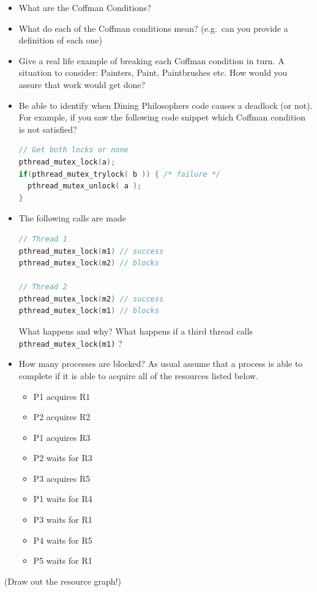 \begin{itemize}
\item
  What are the Coffman Conditions?
\item
  What do each of the Coffman conditions mean? (e.g.~can you provide a definition of each one)
\item
  Give a real life example of breaking each Coffman condition in turn. A situation to consider: Painters, Paint, Paintbrushes etc. How would you assure that work would get done?
\item
  Be able to identify when Dining Philosophers code causes a deadlock (or not). For example, if you saw the following code snippet which Coffman condition is not satisfied?

\begin{lstlisting}[language=C]
// Get both locks or none
pthread_mutex_lock(a);
if(pthread_mutex_trylock( b )) { /* failure */
  pthread_mutex_unlock( a );
}
\end{lstlisting}
\item
  The following calls are made

\begin{lstlisting}[language=c]
// Thread 1
pthread_mutex_lock(m1) // success
pthread_mutex_lock(m2) // blocks

// Thread 2
pthread_mutex_lock(m2) // success
pthread_mutex_lock(m1) // blocks
\end{lstlisting}

  What happens and why? What happens if a third thread calls
  \texttt{pthread\_mutex\_lock(m1)} ?
\item
  How many processes are blocked? As usual assume that a process is able
  to complete if it is able to acquire all of the resources listed
  below.

  \begin{itemize}
  \tightlist
  \item
    P1 acquires R1
  \item
    P2 acquires R2
  \item
    P1 acquires R3
  \item
    P2 waits for R3
  \item
    P3 acquires R5
  \item
    P1 waits for R4
  \item
    P3 waits for R1
  \item
    P4 waits for R5
  \item
    P5 waits for R1
  \end{itemize}
\end{itemize}

(Draw out the resource graph!)



